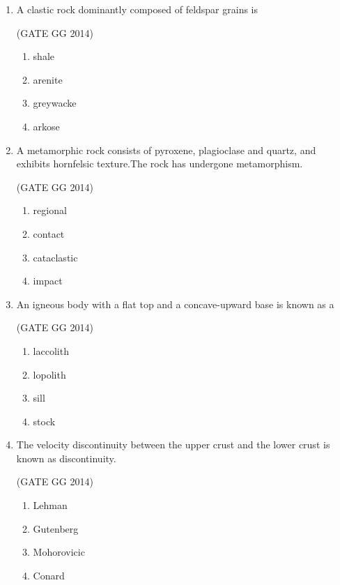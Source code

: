 \documentclass[journal]{IEEEtran}
\begin{document}
\begin{enumerate}[start=1]
\item A clastic rock dominantly composed of feldspar grains is

\hfill{(GATE GG 2014)}\\
\begin{multicols}{4}
    \begin{enumerate}
    \item  shale
\item  arenite
\item  greywacke
\item  arkose
\end{enumerate}
\end{multicols}



\item A metamorphic rock consists of pyroxene, plagioclase and quartz, and exhibits hornfelsic texture.The rock has undergone \makebox[2cm]{\hrulefill} metamorphism.

\hfill{(GATE GG 2014)}\\
\begin{multicols}{4}
    \begin{enumerate}
    \item  regional
\item  contact
\item  cataclastic
\item  impact
\end{enumerate}

\end{multicols}

\item An igneous body with a flat top and a concave-upward base is known as a

\hfill{(GATE GG 2014)}\\
\begin{multicols}{4}
    \begin{enumerate}
    \item  laccolith
\item  lopolith
\item  sill
\item  stock
\end{enumerate}
\end{multicols}


\item The velocity discontinuity between the upper crust and the lower crust is known as \makebox[2cm]{\hrulefill} discontinuity.

\hfill{(GATE GG 2014)}\\
\begin{multicols}{2}
    \begin{enumerate}
    \item Lehman
    \item Gutenberg
    \item Mohorovicic
    \item Conard
\end{enumerate}
\end{multicols}



\end{enumerate}
\end{document}
